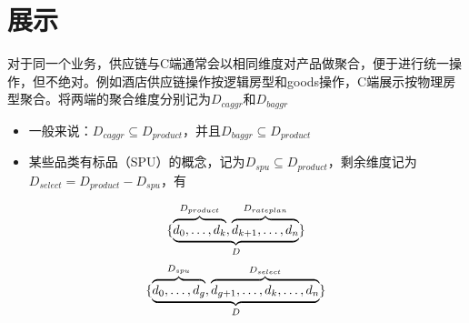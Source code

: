 \documentclass[a4paper]{article}
\begin{document}
\section{展示}

对于同一个业务，供应链与C端通常会以相同维度对产品做聚合，便于进行统一操作，但不绝对。例如酒店供应链操作按逻辑房型和goods操作，C端展示按物理房型聚合。将两端的聚合维度分别记为$D_{caggr}$和$D_{baggr}$
\begin{itemize}
    \item 一般来说：$D_{caggr} \subseteq D_{product}$，并且$D_{baggr} \subseteq D_{product}$
    \item 某些品类有标品（SPU）的概念，记为$D_{spu} \subseteq D_{product}$，剩余维度记为$D_{select}=D_{product}-D_{spu}$，有
\end{itemize}
\begin{equation}
    \{\underbrace{%
        \overbrace{\mathstrut d_0,\ldots,d_k}^{D_{product}},
        \overbrace{\mathstrut d_{k+1},\ldots,d_n}^{D_{rateplan}}
    }
    _{D} \}
\end{equation}
\begin{equation}
    \{\underbrace{%
        \overbrace{\mathstrut d_0,\ldots,d_g}^{D_{spu}},
        \overbrace{\mathstrut d_{g+1},\ldots,d_k,\ldots,d_n}^{D_{select}}
    }
    _{D} \}
\end{equation}
\end{document}
